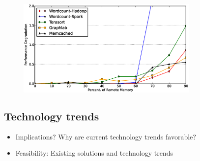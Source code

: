 %
\begin{figure}
  \centering
    \includegraphics[width = 3.5in]{img/vary_remote_mem.eps} 
  \caption{\small{}}
  \label{fig:impb}
\end{figure}
%


\subsection{Technology trends}
\label{ssec:rtt}

\begin{itemize}
	\item Implications? Why are current technology trends favorable?
	\item Feasibility: Existing solutions and technology trends
\end{itemize}